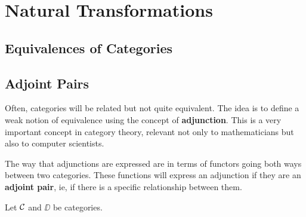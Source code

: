 \section{Natural Transformations}

\sorry

\subsection{Equivalences of Categories}

\sorry

\subsection{Adjoint Pairs}

Often, categories will be related but not quite equivalent. The idea is to define a weak notion of equivalence using the concept of \textbf{adjunction}. This is a very important concept in category theory, relevant not only to mathematicians but also to computer scientists.

The way that adjunctions are expressed are in terms of functors going both ways between two categories. These functions will express an adjunction if they are an \textbf{adjoint pair}, ie, if there is a specific relationship between them.

\begin{boxdefinition}
    Let $\mathcal{C}$ and $\DD$ be categories. \sorry %
\end{boxdefinition}

\begin{boxexample} %
    
\end{boxexample}
